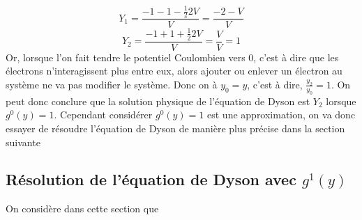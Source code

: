 \documentclass[12pt]{article}
\begin{document}
\begin{equation}
 Y_1 = \frac{-1 -1 - \frac{1}{2} 2 V }{V} =\frac{-2 -V}{V}
\end{equation}
\begin{equation}
 Y_2 = \frac{-1 + 1 +\frac{1}{2}2V }{V} = \frac{V}{V} = 1
\end{equation}
Or, lorsque l'on fait tendre le potentiel Coulombien vers 0, c'est \`a dire que les \'electrons n'interagissent plus entre eux, alors ajouter ou enlever un \'electron au syst\`eme ne va pas modifier le syst\`eme. Donc on \`a $y_0 = y$, c'est à dire, $\frac{y_2}{y_0} = 1$.
On peut donc conclure que la solution physique de l'\'equation de Dyson est $Y_2$ lorsque $g^0(y) = 1$.
\newline
Cependant consid\'erer $g^0(y) = 1$ est une approximation, on va donc essayer de r\'esoudre l'\'equation de Dyson de mani\`ere plus pr\'ecise dans la section suivante

\subsection{R\'esolution de l'\'equation de Dyson avec $g^1(y)$}
On consid\`ere dans cette section que 
\end{document}
